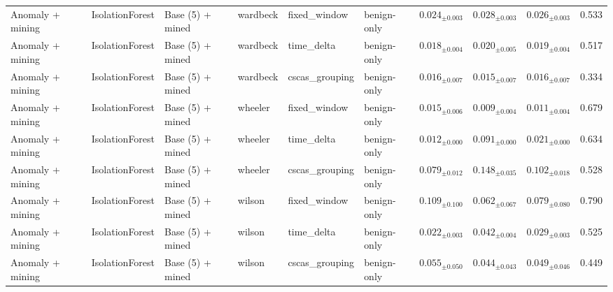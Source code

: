 \begin{longtable}{llllllcccc}
\addlinespace
Anomaly + mining & IsolationForest & Base (5) + mined & wardbeck & fixed\_window & benign-only & $0.024_{\pm 0.003}$ & $0.028_{\pm 0.003}$ & $0.026_{\pm 0.003}$ & 0.533 \\
\addlinespace
Anomaly + mining & IsolationForest & Base (5) + mined & wardbeck & time\_delta & benign-only & $0.018_{\pm 0.004}$ & $0.020_{\pm 0.005}$ & $0.019_{\pm 0.004}$ & 0.517 \\
\addlinespace
Anomaly + mining & IsolationForest & Base (5) + mined & wardbeck & cscas\_grouping & benign-only & $0.016_{\pm 0.007}$ & $0.015_{\pm 0.007}$ & $0.016_{\pm 0.007}$ & 0.334 \\
\addlinespace
Anomaly + mining & IsolationForest & Base (5) + mined & wheeler & fixed\_window & benign-only & $0.015_{\pm 0.006}$ & $0.009_{\pm 0.004}$ & $0.011_{\pm 0.004}$ & 0.679 \\
\addlinespace
Anomaly + mining & IsolationForest & Base (5) + mined & wheeler & time\_delta & benign-only & $0.012_{\pm 0.000}$ & $0.091_{\pm 0.000}$ & $0.021_{\pm 0.000}$ & 0.634 \\
\addlinespace
Anomaly + mining & IsolationForest & Base (5) + mined & wheeler & cscas\_grouping & benign-only & $0.079_{\pm 0.012}$ & $0.148_{\pm 0.035}$ & $0.102_{\pm 0.018}$ & 0.528 \\
\addlinespace
Anomaly + mining & IsolationForest & Base (5) + mined & wilson & fixed\_window & benign-only & $0.109_{\pm 0.100}$ & $0.062_{\pm 0.067}$ & $0.079_{\pm 0.080}$ & 0.790 \\
\addlinespace
Anomaly + mining & IsolationForest & Base (5) + mined & wilson & time\_delta & benign-only & $0.022_{\pm 0.003}$ & $0.042_{\pm 0.004}$ & $0.029_{\pm 0.003}$ & 0.525 \\
\addlinespace
Anomaly + mining & IsolationForest & Base (5) + mined & wilson & cscas\_grouping & benign-only & $0.055_{\pm 0.050}$ & $0.044_{\pm 0.043}$ & $0.049_{\pm 0.046}$ & 0.449 \\
\end{longtable}
